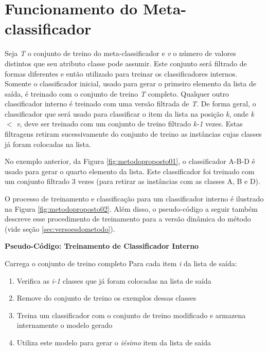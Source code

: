\section{Funcionamento do Meta-classificador}

Seja \textit{T} o conjunto de treino do meta-classificador e \textit{v} o número de valores distintos que seu atributo classe pode assumir. 
Este conjunto será filtrado de formas diferentes e então utilizado para treinar os classificadores internos. 
Somente o classificador inicial, usado para gerar o primeiro elemento da lista de saída, é treinado com o conjunto de treino \textit{T} completo. 
Qualquer outro classificador interno é treinado com uma versão filtrada de  \textit{T}. 
De forma geral, o classificador que será usado para classificar o item da lista na posição \textit{k}, onde \textit{k} $<$ \textit{v}, deve ser treinado com um conjunto de treino filtrado \textit{k-1} vezes. 
Estas filtragens retiram sucessivamente do conjunto de treino as instâncias cujas classes já foram colocadas na lista.

No exemplo anterior, da Figura \ref{fig:metodoproposto01}, o classificador A-B-D é usado para gerar o quarto elemento da lista.
Este classificador foi treinado com um conjunto filtrado 3 vezes (para retirar as instâncias com as classes A, B e D).

O processo de treinamento e classificação para um classificador interno é ilustrado na Figura \ref{fig:metodoproposto02}.
Além disso, o pseudo-código a seguir também descreve esse procedimento de treinamento para a versão dinâmica do método (vide seção \ref{sec:versoesdometodo}).
\\

\hline
\begin{center}
\textbf{Pseudo-Código: Treinamento de Classificador Interno}
\end{center}
\hline
\hfill \break
Carrega o conjunto de treino completo\newline
Para cada item \textit{i} da lista de saída:
\begin{enumerate}
\item Verifica as \textit{i-1} classes que já foram colocadas na lista de saída
\item Remove do conjunto de treino os exemplos dessas classes
\item Treina um classificador com o conjunto de treino modificado e armazena internamente o modelo gerado
\item Utiliza este modelo para gerar o \textit{iésimo} item da lista de saída
\end{enumerate}
\hline
\hfill \break

